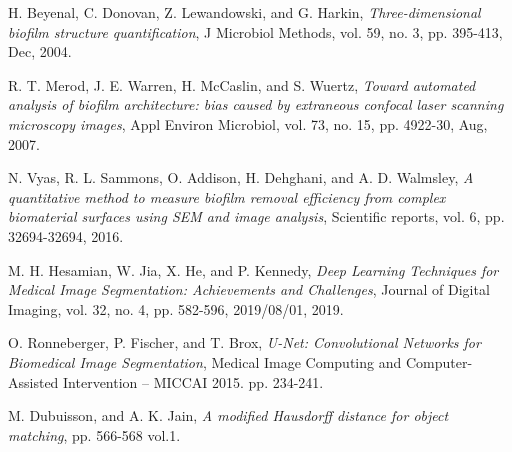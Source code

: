 \documentclass[conference]{IEEEtran}
\begin{document}
\begin{thebibliography}{1}
H. Beyenal, C. Donovan, Z. Lewandowski, and G. Harkin, \emph{Three-dimensional biofilm structure quantification}, J Microbiol Methods, vol. 59, no. 3, pp. 395-413, Dec, 2004.

R. T. Merod, J. E. Warren, H. McCaslin, and S. Wuertz, \emph{Toward automated analysis of biofilm architecture: bias caused by extraneous confocal laser scanning microscopy images}, Appl Environ Microbiol, vol. 73, no. 15, pp. 4922-30, Aug, 2007.

N. Vyas, R. L. Sammons, O. Addison, H. Dehghani, and A. D. Walmsley, \emph{A quantitative method to measure biofilm removal efficiency from complex biomaterial surfaces using SEM and image analysis}, Scientific reports, vol. 6, pp. 32694-32694, 2016.

M. H. Hesamian, W. Jia, X. He, and P. Kennedy, \emph{Deep Learning Techniques for Medical Image Segmentation: Achievements and Challenges}, Journal of Digital Imaging, vol. 32, no. 4, pp. 582-596, 2019/08/01, 2019.

O. Ronneberger, P. Fischer, and T. Brox, \emph{U-Net: Convolutional Networks for Biomedical Image Segmentation}, Medical Image Computing and Computer-Assisted Intervention – MICCAI 2015. pp. 234-241.

M. Dubuisson, and A. K. Jain, \emph{A modified Hausdorff distance for object matching}, pp. 566-568 vol.1.



\end{thebibliography}
\end{document}

